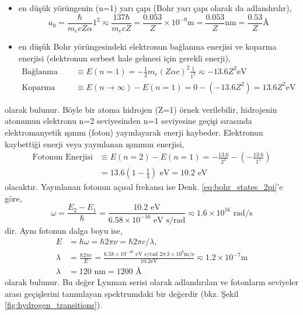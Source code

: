 \documentclass[00_kitap.tex]{subfiles}
\begin{document}
\begin{itemize}
\item en düşük yörüngenin (n=1) yarı çapı (Bohr yarı çapı olarak da adlandırılır),
\begin{equation}
a_0 = \frac{\hbar}{m_e c Z \alpha} 1^2 \eqsim \frac{137\hbar}{m_e c Z} = \frac{0.053}{Z}\times 10^{-9} \text{m} = \frac{0.053}{Z} \text{nm} = \frac{0.53}{Z} \text{\AA}
\label{eq:bohr_radius}
\end{equation}

\item en düşük Bohr yörüngesindeki elektronun bağlanma enerjisi ve koparma enerjisi (elektronun serbest hale gelmesi için gerekli enerji),
\begin{align}
\text{Bağlanma Enerjisi} &\equiv E(n=1) = -\frac{1}{2}m_e (Z \alpha c)^2 \frac{1}{1^2} \eqsim -13.6 Z^2 \text{eV} \\
\text{Koparma Enerjisi} &\equiv E(n\rightarrow\infty) - E(n=1) = 0 - (-13.6 Z^2) = 13.6 Z^2 \text{eV}
\label{eq:bindingEnergy}
\end{align}
\end{itemize}
olarak bulunur. Böyle bir atoma hidrojen (Z=1) örnek verilebilir, hidrojenin atomunun elektronu n=2 seviyesinden n=1 seviyesine geçişi sırasında elektromanyetik ışınım (foton) yayınlayarak enerji kaybeder. Elektronun kaybettiği enerji veya yayınlanan ışınımın enerjisi,
\begin{align}
\text{Fotonun Enerjisi} &\equiv E(n=2) - E(n=1) 
= -\frac{13.6}{2^2} - (-\frac{13.6}{1^2}) \nonumber \\ 
&=  13.6 (1-\frac{1}{4}) \text{ eV} = 10.2 \text{ eV}
\label{eq:fotonEnergy}
\end{align}
olacaktır. Yayınlanan fotonun açısal frekansı ise Denk. \ref{eq:bohr_states_2pi}'e göre,
\begin{equation*}
\omega = \frac{E_2 - E_1}{\hbar} = \frac{10.2 \text{ eV}}{6.58\times 10^{-16} \text{ eV s/rad}} \eqsim 1.6 \times 10^{16} \text{ rad/s}
\end{equation*}
dir. Aynı fotonun dalga boyu ise,
\begin{align*}
E &= \hbar \omega = \hbar 2\pi \nu = \hbar 2\pi c/\lambda, \\
\lambda &= \frac{\hbar 2\pi c}{E} = 
\frac{6.58\times 10^{-16} \text{ eV s/rad } 2\pi\,3\times 10^8 \text{m/s}}{10.2 \text{eV}}\eqsim 1.2\times 10^{-7} \text{m}\\
\lambda &= 120 \text{ nm} = 1200 \text{ \AA} 
\end{align*}
olarak bulunur. Bu değer Lynman serisi olarak adlandırılan ve fotonların seviyeler arası geçişlerini tanımlayan spektrumdaki bir değerdir (bkz. Şekil \ref{fig:hydrogen_transitions}).
\end{document}
